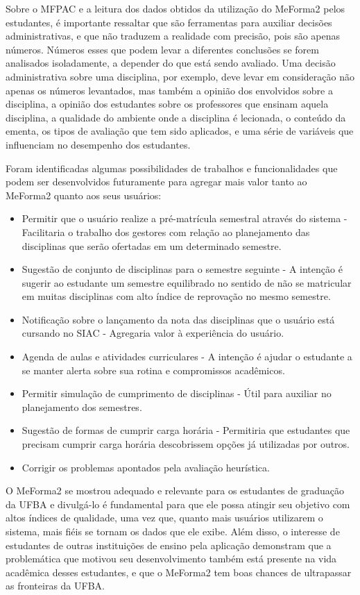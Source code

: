 Sobre o MFPAC e a leitura dos dados obtidos da utilização do MeForma2 pelos estudantes, é importante ressaltar que são ferramentas para auxiliar decisões administrativas, e que não traduzem a realidade com precisão, pois são apenas números. Números esses que podem levar a diferentes conclusões se forem analisados isoladamente, a depender do que está sendo avaliado. Uma decisão administrativa sobre uma disciplina, por exemplo, deve levar em consideração não apenas os números levantados, mas também a opinião dos envolvidos sobre a disciplina, a opinião dos estudantes sobre os professores que ensinam aquela disciplina, a qualidade do ambiente onde a disciplina é lecionada, o conteúdo da ementa, os tipos de avaliação que tem sido aplicados, e uma série de variáveis que influenciam no desempenho dos estudantes. 

Foram identificadas algumas possibilidades de trabalhos e funcionalidades que podem ser desenvolvidos futuramente para agregar mais valor tanto ao MeForma2 quanto aos seus usuários:

\begin{itemize}
    \item Permitir que o usuário realize a pré-matrícula semestral através do sistema - Facilitaria o trabalho dos gestores com relação ao planejamento das disciplinas que serão ofertadas em um determinado semestre.
    \item Sugestão de conjunto de disciplinas para o semestre seguinte - A intenção é sugerir ao estudante um semestre equilibrado no sentido de não se matricular em muitas disciplinas com alto índice de reprovação no mesmo semestre.
    \item Notificação sobre o lançamento da nota das disciplinas que o usuário está cursando no SIAC - Agregaria valor à experiência do usuário.
    \item Agenda de aulas e atividades curriculares - A intenção é ajudar o estudante a se manter alerta sobre sua rotina e compromissos acadêmicos.
    \item Permitir simulação de cumprimento de disciplinas - Útil para auxiliar no planejamento dos semestres.
    \item Sugestão de formas de cumprir carga horária - Permitiria que estudantes que precisam cumprir carga horária descobrissem opções já utilizadas por outros.
    \item Corrigir os problemas apontados pela avaliação heurística.
\end{itemize}

O MeForma2 se mostrou adequado e relevante para os estudantes de graduação da UFBA e divulgá-lo é fundamental para que ele possa atingir seu objetivo com altos índices de qualidade, uma vez que, quanto mais usuários utilizarem o sistema, mais fiéis se tornam os dados que ele exibe. Além disso, o interesse de estudantes de outras instituições de ensino pela aplicação demonstram que a problemática que motivou seu desenvolvimento também está presente na vida acadêmica desses estudantes, e que o MeForma2 tem boas chances de ultrapassar as fronteiras da UFBA.
